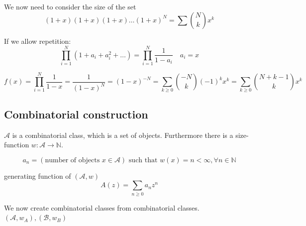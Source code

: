 We now need to consider the size of the set
\[
    (1+x)(1+x)(1+x) \ldots (1+x)^N = \sum {N \choose k} x^k
\]

If we allow repetition:
\[
    \prod _{i=1}^N (1+a_i + a_i^2 + \ldots) = \prod _{i=1}^N \frac{1}{1-a_i} \quad a_i = x
\]

\[
    f(x) = \prod _{i=1}^N \frac{1}{1-x} = \frac{1}{(1-x)^N}
    = (1-x)^{-N}
    = \sum _{k \geq 0} {-N \choose k} (-1)^k x^k
    = \sum _{k \geq 0} {N + k-1 \choose k} x^k
\]

\subsection{Combinatorial construction}
$\mathcal{A}$ is a combinatorial class, which is a set of objects.
Furthermore there is a size-function $w: \mathcal{A} \rightarrow \mathbb{N}$.

\[
a_n = \left(\text{number of objects } x\in \mathcal{A}\right) \text{ such that }w(x) = n < \infty,  \forall n \in \mathbb{N}
\]

generating function of $(\mathcal{A}, w)$
\[
    A(z) = \sum_{n\geq 0 } a_n z^n
\]

We now create combinatorial classes from combinatorial classes.
$(\mathcal{A}, w_A) , (\mathcal{B}, w_B)$

